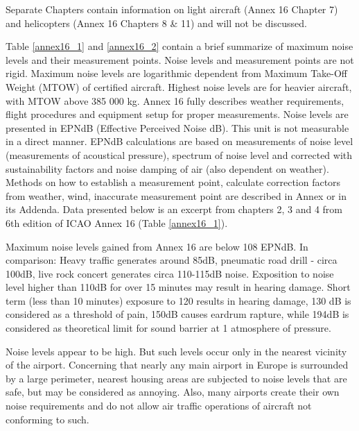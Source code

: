Separate Chapters contain information on light aircraft (Annex 16 Chapter 7) and helicopters (Annex 16 Chapters 8 \& 11) and will not be discussed.

Table \ref{annex16_1} and \ref{annex16_2} contain a brief summarize of maximum noise levels and their measurement points. Noise levels and measurement points are not rigid. Maximum noise levels are logarithmic dependent from Maximum Take-Off Weight (MTOW) of certified aircraft. Highest noise levels are for heavier aircraft, with MTOW above 385 000 kg. Annex 16 fully describes weather requirements, flight procedures and equipment setup for proper measurements. Noise levels are presented in EPNdB (Effective Perceived Noise dB). This unit is not measurable in a direct manner. EPNdB calculations are based on measurements of noise level (measurements of acoustical pressure), spectrum of noise level and corrected with sustainability factors and noise damping of air (also dependent on weather). Methods on how to establish a measurement point, calculate correction factors from weather, wind, inaccurate measurement point are described in Annex or in its Addenda. Data presented below is an excerpt from chapters 2, 3 and 4 from 6th edition of ICAO Annex 16 (Table \ref{annex16_1}).

Maximum noise levels gained from Annex 16 are below 108 EPNdB. In comparison: Heavy traffic generates around 85dB, pneumatic road drill - circa 100dB, live rock concert generates circa 110-115dB noise. Exposition to noise level higher than 110dB for over 15 minutes may result in hearing damage. Short term (less than 10 minutes) exposure to 120 results in hearing damage, 130 dB is considered as a threshold of pain, 150dB causes eardrum rapture, while 194dB is considered as theoretical limit for sound barrier at 1 atmosphere of pressure.

Noise levels appear to be high. But such levels occur only in the nearest vicinity of the airport. Concerning that nearly any main airport in Europe is surrounded by a large perimeter, nearest housing areas are subjected to noise levels that are safe, but may be considered as annoying. Also, many airports create their own noise requirements and do not allow air traffic operations of aircraft not conforming to such.

